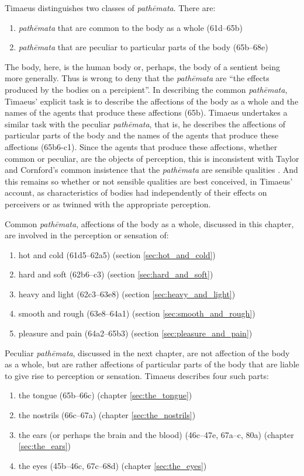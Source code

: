 Timaeus distinguishes two classes of \emph{pathēmata}. There are:
\begin{enumerate}[(1)]
	\item \emph{pathēmata} that are common to the body as a whole (61d--65b)
	\item \emph{pathēmata} that are peculiar to particular parts of the body (65b--68e)
\end{enumerate}
The body, here, is the human body or, perhaps, the body of a sentient being more generally. Thus \citet[431]{Taylor:1928qb} is wrong to deny that the \emph{pathēmata} are ``the effects produced by the bodies on a percipient''. In describing the common \emph{pathēmata}, Timaeus' explicit task is to describe the affections of the body as a whole and the names of the agents that produce these affections (65b). Timaeus undertakes a similar task with the peculiar \emph{pathēmata}, that is, he describes the affections of particular parts of the body and the names of the agents that produce these affections (65b6-c1). Since the agents that produce these affections, whether common or peculiar, are the objects of perception, this is inconsistent with Taylor and Cornford's common insistence that the \emph{pathēmata} are sensible qualities \citep[see][225, n8]{Archer-Hind:1888qd}. And this remains so whether or not sensible qualities are best conceived, in Timaeus' account, as characteristics of bodies had independently of their effects on perceivers or as twinned with the appropriate perception. 

Common \emph{pathēmata}, affections of the body as a whole, discussed in this chapter, are involved in the perception or sensation of:
\begin{enumerate}[(1)]
 	\item hot and cold (61d5--62a5) (section \ref{sec:hot_and_cold})
 	\item hard and soft (62b6--c3) (section \ref{sec:hard_and_soft})
 	\item heavy and light (62c3--63e8) (section \ref{sec:heavy_and_light})
 	\item smooth and rough (63e8--64a1) (section \ref{sec:smooth_and_rough})
 	\item pleasure and pain (64a2--65b3) (section \ref{sec:pleasure_and_pain})
\end{enumerate}

Peculiar \emph{pathēmata}, discussed in the next chapter, are not affection of the body as a whole, but are rather affections of particular parts of the body that are liable to give rise to perception or sensation. Timaeus describes four such parts:
\begin{enumerate}[(1)]
	\item the tongue (65b--66c) (chapter \ref{sec:the_tongue})
	\item the nostrils (66c--67a) (chapter \ref{sec:the_nostrils})
	\item the ears (or perhaps the brain and the blood) (46c--47e, 67a--c, 80a) (chapter \ref{sec:the_ears})
	\item the eyes (45b--46c, 67c--68d) (chapter \ref{sec:the_eyes})
\end{enumerate}

